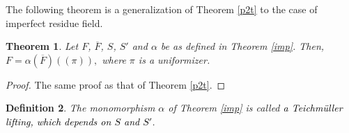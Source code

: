 \documentclass[times,10pt]{amsart}
\newtheorem{thm}{Theorem}[section]
\newtheorem{defn}[thm]{Definition}%
\begin{document}
{The following theorem is a generalization of Theorem \ref{p2t} to the case of imperfect residue field.
 
\begin{thm}\label{im2t}
    Let $F$, $\overline{F}$, $S$,  $S'$ and $\alpha$  be as defined in  Theorem \ref{imp}. Then, 
$F=\alpha(\overline{F})((\pi)),$ where $\pi$ is a uniformizer. 
\end{thm}
\begin{proof}
{The same proof as that of Theorem  \ref{p2t}.} 
\end{proof}


\begin{defn}\label{Tfd}
The monomorphism $\alpha$ of Theorem \ref{imp} is called \textcolor{black}{a Teichm\"uller lifting, which depends on $S$ and $S'$}.
\end{defn}


}
\end{document}
